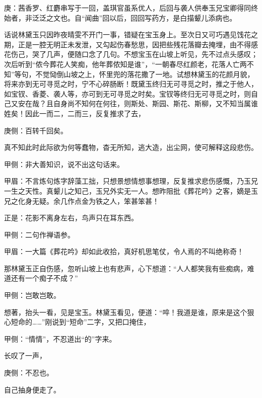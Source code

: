 

\begin{parag}
    \begin{note}庚：茜香罗、红麝串写于一回，盖琪官虽系优人，后回与袭人供奉玉兄宝卿得同终始者，非泛泛之文也。自“闻曲”回以后，回回写药方，是白描颦儿添病也。\end{note}
\end{parag}


\begin{parag}
    话说林黛玉只因昨夜晴雯不开门一事，错疑在宝玉身上。至次日又可巧遇见饯花之期，正是一腔无明正未发泄，又勾起伤春愁思，因把些残花落瓣去掩埋，由不得感花伤己，哭了几声，便随口念了几句。不想宝玉在山坡上听见，先不过点头感叹；次后听到“侬今葬花人笑痴，他年葬侬知是谁”，“一朝春尽红颜老，花落人亡两不知”等句，不觉恸倒山坡之上，怀里兜的落花撒了一地。试想林黛玉的花颜月貌，将来亦到无可寻觅之时，宁不心碎肠断！既黛玉终归无可寻觅之时，推之于他人，如宝钗、香菱、袭人等，亦可到无可寻觅之时矣。宝钗等终归无可寻觅之时，则自己又安在哉？且自身尚不知何在何往，则斯处、斯园、斯花、斯柳，又不知当属谁姓矣！因此一而二，二而三，反复推求了去，\begin{note}庚侧：百转千回矣。\end{note}真不知此时此际欲为何等蠢物，杳无所知，逃大造，出尘网，使可解释这段悲伤。\begin{note}甲侧：非大善知识，说不出这句话来。\end{note}\begin{note}甲眉：不言炼句炼字辞藻工拙，只想景想情想事想理，反复推求悲伤感慨，乃玉兄一生之天性。真颦儿之知己，玉兄外实无一人。想昨阻批《葬花吟》之客，嫡是玉兄之化身无疑。余几作点金为铁之人，笨甚笨甚！\end{note}正是：花影不离身左右，鸟声只在耳东西。\begin{note}甲侧：二句作禅语参。\end{note}\begin{note}甲眉：一大篇《葬花吟》却如此收拾，真好机思笔仗，令人焉的不叫绝称奇！\end{note}
\end{parag}


\begin{parag}
    那林黛玉正自伤感，忽听山坡上也有悲声，心下想道：“人人都笑我有些痴病，难道还有一个痴子不成？”\begin{note}甲侧：岂敢岂敢。\end{note}想著，抬头一看，见是宝玉。林黛玉看见，便道：“啐！我道是谁，原来是这个狠心短命的……”刚说到“短命”二字，又把口掩住，\begin{note}甲侧：“情情”，不忍道出“的”字来。\end{note}长叹了一声，\begin{note}庚侧：不忍也。\end{note}自己抽身便走了。
\end{parag}


